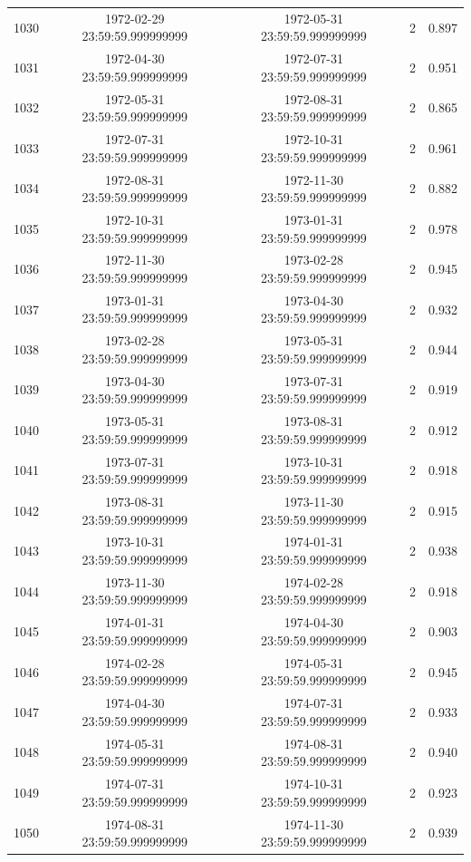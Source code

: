\begin{table}
\begin{tabular}{lcccc}
1030 & 1972-02-29 23:59:59.999999999 & 1972-05-31 23:59:59.999999999 & 2 & 0.897 \\
1031 & 1972-04-30 23:59:59.999999999 & 1972-07-31 23:59:59.999999999 & 2 & 0.951 \\
1032 & 1972-05-31 23:59:59.999999999 & 1972-08-31 23:59:59.999999999 & 2 & 0.865 \\
1033 & 1972-07-31 23:59:59.999999999 & 1972-10-31 23:59:59.999999999 & 2 & 0.961 \\
1034 & 1972-08-31 23:59:59.999999999 & 1972-11-30 23:59:59.999999999 & 2 & 0.882 \\
1035 & 1972-10-31 23:59:59.999999999 & 1973-01-31 23:59:59.999999999 & 2 & 0.978 \\
1036 & 1972-11-30 23:59:59.999999999 & 1973-02-28 23:59:59.999999999 & 2 & 0.945 \\
1037 & 1973-01-31 23:59:59.999999999 & 1973-04-30 23:59:59.999999999 & 2 & 0.932 \\
1038 & 1973-02-28 23:59:59.999999999 & 1973-05-31 23:59:59.999999999 & 2 & 0.944 \\
1039 & 1973-04-30 23:59:59.999999999 & 1973-07-31 23:59:59.999999999 & 2 & 0.919 \\
1040 & 1973-05-31 23:59:59.999999999 & 1973-08-31 23:59:59.999999999 & 2 & 0.912 \\
1041 & 1973-07-31 23:59:59.999999999 & 1973-10-31 23:59:59.999999999 & 2 & 0.918 \\
1042 & 1973-08-31 23:59:59.999999999 & 1973-11-30 23:59:59.999999999 & 2 & 0.915 \\
1043 & 1973-10-31 23:59:59.999999999 & 1974-01-31 23:59:59.999999999 & 2 & 0.938 \\
1044 & 1973-11-30 23:59:59.999999999 & 1974-02-28 23:59:59.999999999 & 2 & 0.918 \\
1045 & 1974-01-31 23:59:59.999999999 & 1974-04-30 23:59:59.999999999 & 2 & 0.903 \\
1046 & 1974-02-28 23:59:59.999999999 & 1974-05-31 23:59:59.999999999 & 2 & 0.945 \\
1047 & 1974-04-30 23:59:59.999999999 & 1974-07-31 23:59:59.999999999 & 2 & 0.933 \\
1048 & 1974-05-31 23:59:59.999999999 & 1974-08-31 23:59:59.999999999 & 2 & 0.940 \\
1049 & 1974-07-31 23:59:59.999999999 & 1974-10-31 23:59:59.999999999 & 2 & 0.923 \\
1050 & 1974-08-31 23:59:59.999999999 & 1974-11-30 23:59:59.999999999 & 2 & 0.939 \\

\end{tabular}
\end{table}
